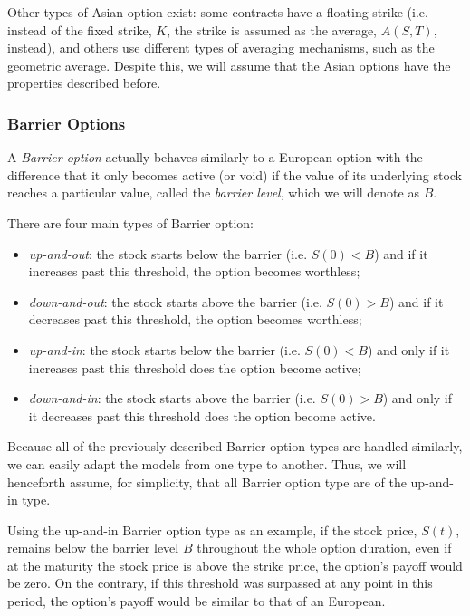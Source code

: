 Other types of Asian option exist: some contracts have a floating strike (i.e. instead of the fixed strike, $K$, the strike is assumed as the average, $A(S,T)$, instead), and others use different types of averaging mechanisms, such as the geometric average. Despite this, we will assume that the Asian options have the properties described before.


\subsubsection{Barrier Options}
A \emph{Barrier option} actually behaves similarly to a European option with the difference that it only becomes active (or void) if the value of its underlying stock reaches a particular value, called the \emph{barrier level}, which we will denote as $B$.

There are four main types of Barrier option:
\begin{itemize}
\item \emph{up-and-out}: the stock starts below the barrier (i.e. $S(0)<B$) and if it increases past this threshold, the option becomes worthless;
\item \emph{down-and-out}: the stock starts above the barrier (i.e. $S(0)>B$) and if it decreases past this threshold, the option becomes worthless;
\item \emph{up-and-in}: the stock starts below the barrier (i.e. $S(0)<B$) and only if it increases past this threshold does the option become active;
\item \emph{down-and-in}: the stock starts above the barrier (i.e. $S(0)>B$) and only if it decreases past this threshold does the option become active.
\end{itemize}

Because all of the previously described Barrier option types are handled similarly, we can easily adapt the models from one type to another. Thus, we will henceforth assume, for simplicity, that all Barrier option type are of the up-and-in type.

Using the up-and-in Barrier option type as an example, if the stock price, $S(t)$, remains below the barrier level $B$ throughout the whole option duration, even if at the maturity the stock price is above the strike price, the option's payoff would be zero. On the contrary, if this threshold was surpassed at any point in this period, the option's payoff would be similar to that of an European.


